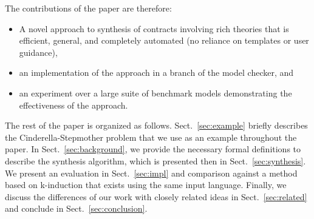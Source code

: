 \iffalse
We evaluate the fixpoint algorithm against the k-inductive approach using a comprehensive benchmark suite containing contracts that were initially used in verification problems, as well as specification for industrial-level designs and versions of the ``Cinderella'' problem from~\cite{beyene2014constraint}.  The experiment demonstrates that this approach is a direct improvement over the k-inductive method in two important aspects: performance and generality.  On all models that can be synthesized by k-induction, the new algorithm always outperforms the k-inductive algorithm in terms of time required for synthesis (on average, 53.64\% faster) while yielding roughly approximate code sizes and execution times for the generated C code.  The new algorithm can synthesize a strictly larger set of benchmark models, and comes with an improved termination guarantee: unlike the k-inductive algorithm, if the algorithm terminates with an `unrealizable' result, then there is no possible realization of the contract.
\fi

The contributions of the paper are therefore:
\begin{itemize}
    \item A novel approach to synthesis of contracts involving rich theories that is efficient, general, and completely automated (no reliance on templates or user guidance),
    \item an implementation of the approach in a branch of the \jkind model checker, and
    \item an experiment over a large suite of benchmark models demonstrating the effectiveness of the approach.
\end{itemize}

The rest of the paper is organized as follows. Sect.~\ref{sec:example} briefly describes the Cinderella-Stepmother problem that we use as an example throughout the paper. In Sect.~\ref{sec:background}, we provide the necessary formal definitions to describe the synthesis algorithm, which is presented then in Sect.~\ref{sec:synthesis}.
We present an evaluation in Sect.~\ref{sec:impl} and comparison against a method based on k-induction that exists using the same input language.  
Finally, we discuss the differences of our work with closely related ideas in Sect.~\ref{sec:related} and conclude in Sect.~\ref{sec:conclusion}.

	
